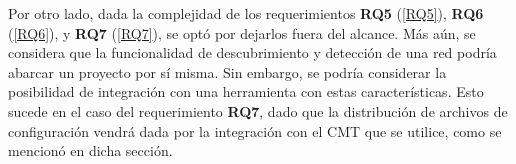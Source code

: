 Por otro lado, dada la complejidad de los requerimientos \textbf{RQ5} (\ref{RQ5}), \textbf{RQ6} (\ref{RQ6}), y \textbf{RQ7} (\ref{RQ7}), se optó por dejarlos fuera del alcance. Más aún, se considera que la funcionalidad de descubrimiento y detección de una red podría abarcar un proyecto por sí misma. Sin embargo, se podría considerar la posibilidad de integración con una herramienta con estas características. Esto sucede en el caso del requerimiento \textbf{RQ7}, dado que la distribución de archivos de configuración vendrá dada por la integración con el CMT que se utilice, como se mencionó en dicha sección.








